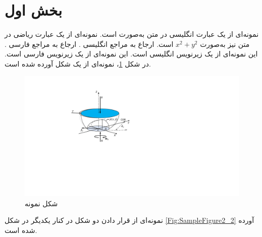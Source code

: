 \section{بخش اول}
نمونه‌ای از یک عبارت انگلیسی در متن به‌صورت
است. نمونه‌ای از یک عبارت ریاضی در متن نیز به‌صورت
$x^2 + y^2$
است. ارجاع به مراجع انگلیسی
\cite{Fakhari2015a,Lewis2003}.
ارجاع به مراجع فارسی
\cite{Fakhari2015b,HadianThesis2008}.
این نمونه‌ای از یک زیرنویس انگلیسی%
است. این نمونه‌ای از یک زیرنویس فارسی%
است. در شکل
\ref{Fig:SampleFigure1_2}،
نمونه‌ای از یک شکل آورده شده است. 

\begin{figure}[!htb]
\centering
\includegraphics[scale=1]{Figures/SampleFigure.pdf}
\caption{شکل نمونه}
\label{Fig:SampleFigure1_2}
\end{figure}

نمونه‌ای از قرار دادن دو شکل در کنار یکدیگر در شکل
\ref{Fig:SampleFigure2_2}
آورده شده است.


